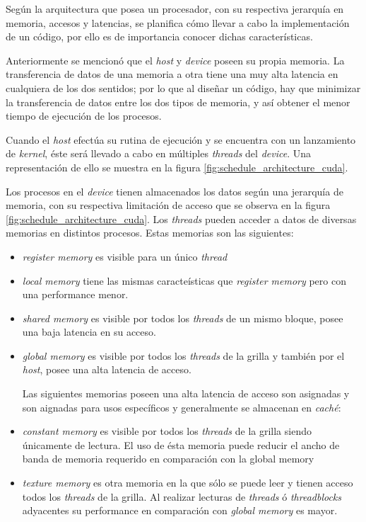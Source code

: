 Según la arquitectura que posea un procesador, con su respectiva jerarquía en memoria, accesos y latencias, se planifica cómo llevar a cabo la implementación de un código, por ello es de importancia conocer dichas características. 

Anteriormente se mencionó que el \textit{host} y \textit{device} poseen su propia memoria. La transferencia de datos de una memoria a otra tiene una muy alta latencia en cualquiera de los dos sentidos; por lo que al diseñar un código, hay que minimizar la transferencia de datos entre los dos tipos de memoria, y así obtener el menor tiempo de ejecución de los procesos.

Cuando el \textit{host} efectúa su rutina de ejecución y se encuentra con un lanzamiento de \textit{kernel}, éste será llevado a cabo en múltiples \textit{threads} del \textit{device}. Una representación de ello se muestra en la figura \ref{fig:schedule_architecture_cuda}. 

Los procesos en el \textit{device} tienen almacenados los datos según una jerarquía de memoria, con su respectiva limitación de acceso que se observa en la figura \ref{fig:schedule_architecture_cuda}. Los \textit{threads} pueden acceder a datos de diversas memorias en distintos procesos. Estas memorias son las siguientes:

\begin{itemize}
	\item  \textit{register memory} es visible para un único \textit{thread}
	\item \textit{local memory} tiene las mismas caracteísticas que \textit{register memory} pero con una performance menor.
	\item \textit{shared memory} es visible por todos los \textit{threads} de un mismo bloque, posee una baja latencia en su acceso.
	\item \textit{global memory} es visible por todos los \textit{threads} de la grilla y también por el \textit{host}, posee una alta latencia de acceso.
	
	Las siguientes memorias poseen una alta latencia de acceso son asignadas y son aignadas para usos específicos y generalmente se almacenan en \textit{caché}:
	
	\item \textit{constant memory} es visible por todos los \textit{threads} de la grilla siendo únicamente de lectura. El uso de ésta memoria puede reducir el ancho de banda de memoria requerido en comparación con la {global memory}
	\item \textit{texture memory} es otra memoria en la que sólo se puede leer y tienen acceso todos los \textit{threads} de la grilla. Al realizar lecturas de \textit{threads} ó \textit{threadblocks} adyacentes su performance en comparación con \textit{global memory} es mayor. 
	
\end{itemize}


